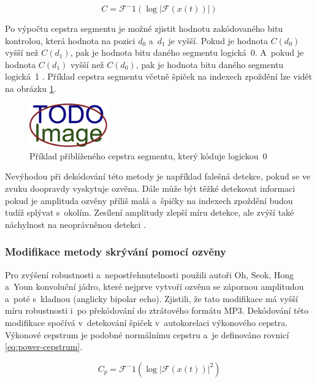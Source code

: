 \begin{equation}
    \label{eq:cepstrum}
    C = \mathcal{F}^-1(\log{|\mathcal{F}(x(t))|})
\end{equation}

Po výpočtu cepstra segmentu je možné zjistit hodnotu zakódovaného bitu
kontrolou, která hodnota na pozici $d_0$ a~$d_1$ je vyšší. Pokud je hodnota
$C(d_0)$ vyšší než $C(d_1)$, pak je hodnota bitu daného segmentu logická~0.
A~pokud je hodnota $C(d_1)$ vyšší než $C(d_0)$, pak je hodnota bitu daného
segmentu logická~1 \cite{Gruhl1996}. Příklad cepstra segmentu včetně špiček na
indexech zpoždění lze vidět na obrázku \ref{pic:segment-cepstrum}.

\begin{figure}[hbt]
    \centering
    \includegraphics[width=0.3\textwidth]{obrazky/placeholder.pdf}
    \caption{Příklad přiblíženého cepstra segmentu, který kóduje logickou~0}
    \label{pic:segment-cepstrum}
\end{figure}

Nevýhodou při dekódování této metody je například falešná detekce, pokud se ve
zvuku doopravdy vyskytuje ozvěna. Dále může být těžké detekovat informaci pokud
je amplituda ozvěny příliš malá a~špičky na indexech zpoždění budou tudíž
splývat s~okolím. Zesílení amplitudy zlepší míru detekce, ale zvýší také
náchylnost na neoprávněnou detekci \cite{Kim2003}.

\subsubsection*{Modifikace metody skrývání pomocí ozvěny}
\label{ssub:echo-modifications}

Pro zvýšení robustnosti a~nepostřehnutelnosti použili autoři Oh, Seok, Hong
a~Youn \cite{Oh2001} konvoluční jádro, které nejprve vytvoří ozvěnu se zápornou
amplitudou a~poté s~kladnou (anglicky bipolar echo). Zjistili, že tato
modifikace má vyšší míru robustnosti i~po překódování do ztrátového formátu
MP3. Dekódování této modifikace spočívá v~detekování špiček v~autokorelaci
výkonového cepstra. Výkonové cepstrum je podobné normálnímu cepstru a~je
definováno rovnicí \ref{eq:power-cepstrum}.

\begin{equation}
    \label{eq:power-cepstrum}
    C_p = \mathcal{F}^-1(\log{|\mathcal{F}(x(t))|}^2)
\end{equation}

